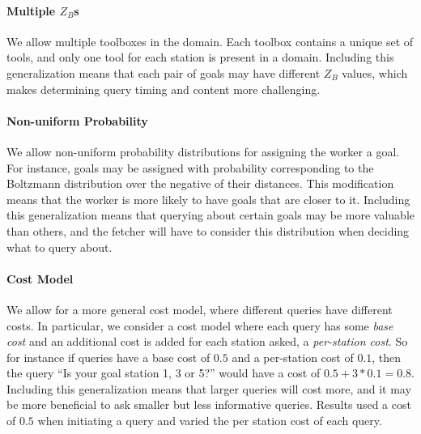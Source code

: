 \documentclass[letterpaper]{article}
\begin{document}
    \paragraph{Multiple $Z_B$s} We allow multiple toolboxes in the domain. Each toolbox contains a unique set of tools, and only one tool for each station is present in a domain. Including this generalization means that each pair of goals may have different $Z_B$ values, which makes determining query timing and content more challenging. %
    \paragraph{Non-uniform Probability} We allow non-uniform probability distributions for assigning the worker a goal. For instance, goals may be assigned with probability corresponding to the Boltzmann distribution over the negative of their distances. This modification means that the worker is more likely to have goals that are closer to it. Including this generalization means that querying about certain goals may be more valuable than others, and the fetcher will have to consider this distribution when deciding what to query about.
    \paragraph{Cost Model} We allow for a more general cost model, where different queries have different costs. In particular, we consider a cost model where each query has some \emph{base cost} and an additional cost is added for each station asked, a \emph{per-station cost}. So for instance if queries have a base cost of $0.5$ and a per-station cost of $0.1$, then the query ``Is your goal station 1, 3 or 5?'' would have a cost of $0.5 + 3*0.1 = 0.8$. Including this generalization means that larger queries will cost more, and it may be more beneficial to ask smaller but less informative queries.
Results used a cost of $0.5$ when initiating a query and varied the per station cost of each query.
\end{document}
